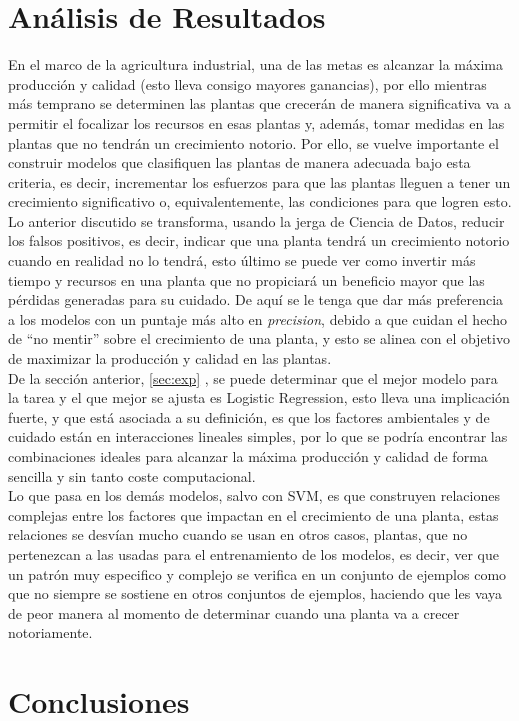 \documentclass[12pt,a4paper]{article}
\begin{document}
    \section{Análisis de Resultados}
    {
        En el marco de la agricultura industrial, una de las metas es alcanzar 
        la máxima producción y calidad (esto lleva consigo mayores ganancias), 
        por ello mientras más temprano se determinen las plantas que crecerán 
        de manera significativa va a permitir el focalizar los recursos en esas 
        plantas y, además, tomar medidas en las plantas que no tendrán un 
        crecimiento notorio. Por ello, se vuelve importante el construir modelos 
        que clasifiquen las plantas de manera adecuada bajo esta criteria, es decir, 
        incrementar los esfuerzos para que las plantas lleguen a tener un crecimiento 
        significativo o, equivalentemente, las condiciones para que logren esto.\\

        Lo anterior discutido se transforma, usando la jerga de Ciencia de Datos, reducir 
        los falsos positivos, es decir, indicar que una planta tendrá un crecimiento 
        notorio cuando en realidad no lo tendrá, esto último se puede ver como invertir 
        más tiempo y recursos en una planta que no propiciará un beneficio mayor que 
        las pérdidas generadas para su cuidado. De aquí se le tenga que dar más preferencia 
        a los modelos con un puntaje más alto en \emph{precision}, debido a que cuidan 
        el hecho de ``no mentir'' sobre el crecimiento de una planta, y esto se alinea con 
        el objetivo de maximizar la producción y calidad en las plantas.\\ 

        De la sección anterior, \ref{sec:exp} , se puede determinar 
        que el mejor modelo para la tarea y el que mejor se ajusta es Logistic Regression, 
        esto lleva una implicación fuerte, y que está asociada a su definición, es que 
        los factores ambientales y de cuidado están en interacciones lineales simples, 
        por lo que se podría encontrar las combinaciones ideales para alcanzar la máxima 
        producción y calidad de forma sencilla y sin tanto coste computacional.\\

        Lo que pasa en los demás modelos, salvo con SVM, es que construyen relaciones 
        complejas entre los factores que impactan en el crecimiento de una planta, estas 
        relaciones se desvían mucho cuando se usan en otros casos, plantas, que no 
        pertenezcan a las usadas para el entrenamiento de los modelos, es decir, ver que 
        un patrón muy especifico y complejo se verifica en un conjunto de ejemplos como 
        que no siempre se sostiene en otros conjuntos de ejemplos, haciendo que les vaya 
        de peor manera al momento de determinar cuando una planta va a crecer notoriamente.
    }
    \newpage

    \section{Conclusiones}
    {}
    \newpage

    \printbibliography[heading=bibintoc,title={Referencias Bibliográficas}]
\end{document}
